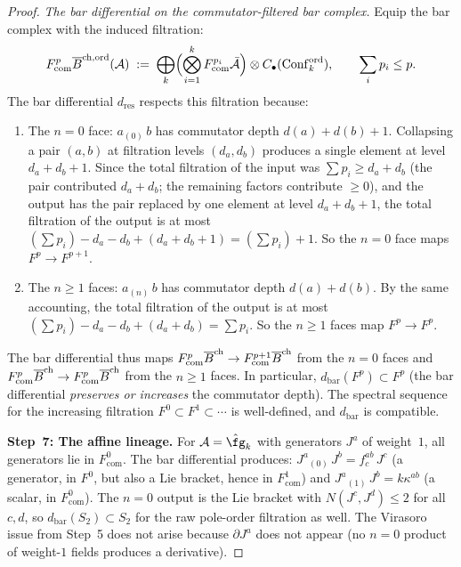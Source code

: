 \begin{proof}
\emph{The bar differential on the commutator-filtered bar complex.}
Equip the bar complex with the induced filtration:
\[
F^p_{\mathrm{com}}\overline{B}^{\mathrm{ch,ord}}(\mathcal{A})
\;:=\;
\bigoplus_k\Bigl(\bigotimes_{i=1}^k F^{p_i}_{\mathrm{com}}\bar{\mathcal{A}}\Bigr)
\otimes C_\bullet(\mathrm{Conf}_k^{\mathrm{ord}}),
\qquad \sum_i p_i\le p.
\]
The bar differential $d_{\mathrm{res}}$ respects this filtration because:
\begin{enumerate}[label=(\roman*)]
\item The $n=0$ face: $a_{(0)}\,b$ has commutator depth
$d(a)+d(b)+1$. Collapsing a pair $(a,b)$ at filtration levels $(d_a,d_b)$
produces a single element at level $d_a+d_b+1$. Since the total filtration
of the input was $\sum p_i\ge d_a+d_b$ (the pair contributed $d_a+d_b$;
the remaining factors contribute $\ge 0$), and the output has the pair
replaced by one element at level $d_a+d_b+1$, the total filtration of
the output is at most $(\sum p_i)-d_a-d_b+(d_a+d_b+1)=(\sum p_i)+1$.
So the $n=0$ face maps $F^p\to F^{p+1}$.

\item The $n\ge 1$ faces: $a_{(n)}\,b$ has commutator depth
$d(a)+d(b)$. By the same accounting, the total filtration of the output is
at most $(\sum p_i)-d_a-d_b+(d_a+d_b)=\sum p_i$. So the $n\ge 1$
faces map $F^p\to F^p$.
\end{enumerate}

The bar differential thus maps
$F^p_{\mathrm{com}}\overline{B}^{\mathrm{ch}}\to F^{p+1}_{\mathrm{com}}\overline{B}^{\mathrm{ch}}$ from the
$n=0$ faces and $F^p_{\mathrm{com}}\overline{B}^{\mathrm{ch}}\to F^p_{\mathrm{com}}\overline{B}^{\mathrm{ch}}$
from the $n\ge 1$ faces. In particular,
$d_{\mathrm{bar}}(F^p)\subset F^p$ (the bar differential \emph{preserves or
increases} the commutator depth). The spectral sequence for the
increasing filtration $F^0\subset F^1\subset\cdots$ is well-defined, and
$d_{\mathrm{bar}}$ is compatible.

\smallskip
\textbf{Step~7: The affine lineage.}
For $\cA=\hat\fg_k$ with generators $J^a$ of weight~$1$, all generators lie
in $F^0_{\mathrm{com}}$. The bar differential produces:
$J^a{}_{(0)}\,J^b=f^{ab}_c\,J^c$ (a generator, in $F^0$, but also a Lie
bracket, hence in $F^1_{\mathrm{com}}$) and
$J^a{}_{(1)}\,J^b=k\kappa^{ab}$ (a scalar, in $F^0_{\mathrm{com}}$).
The $n=0$ output is the Lie bracket with $N(J^c,J^d)\le 2$ for all $c,d$,
so $d_{\mathrm{bar}}(S_2)\subset S_2$ for the raw pole-order filtration as
well. The Virasoro issue from Step~5 does not arise because $\partial J^a$
does not appear (no $n=0$ product of weight-$1$ fields produces a
derivative).


\end{proof}
